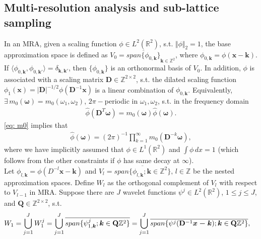 \subsection{Multi-resolution analysis and sub-lattice sampling}
In an MRA, given a scaling function $\phi\in L^2(\mathbb{R}^2)$, s.t. $\Vert\phi\Vert_2=1$,
the base approximation space is defined as $V_0 = \overline{span\{\phi_{0,\boldsymbol{k}}\}}_{\boldsymbol{k}\in\mathbb{Z}^2}$, where $\phi_{0,\boldsymbol{k}} = \phi(\boldsymbol{x}-\boldsymbol{k})$. If $\langle \phi_{0,\boldsymbol{k}},\phi_{0,\boldsymbol{k'}}\rangle = \delta_{\boldsymbol{k,k'}}$, then $\{\phi_{0,\boldsymbol{k}}\}$ is an orthonormal basis of $V_0$. In addition, $\phi$ is associated with a scaling matrix $\mathbf{D}\in\mathbb{Z}^{2\times 2}$, s.t. the dilated scaling function
 $\phi_1(\boldsymbol{x}) = |\mathbf{D}|^{-1/2}\phi(\mathbf{D}^{-1}\boldsymbol{x})$ is a linear combination of $\phi_{0,\boldsymbol{k}}$.
Equivalently, $\exists\,m_0(\boldsymbol{\omega}) = m_0(\omega_1,\omega_2)$, $2\pi-$periodic in $\omega_1,\omega_2$, s.t. in the frequency domain
\begin{align}\label{eq: m0}
\widehat{\phi}(\mathbf{D}^T\boldsymbol{\omega}) = m_0(\boldsymbol{\omega})\widehat{\phi}(\boldsymbol{\omega}).
\end{align}
\eqref{eq: m0} implies that
\begin{align}\label{eq: phi-m0}
\textstyle \hat{\phi}(\boldsymbol{\omega}) = (2\pi)^{-1}\prod_{k=1}^{\infty}m_0(\mathbf{D}^{-k} \boldsymbol{\omega}),
\end{align}
where we have implicitly assumed that $\phi\in L^1(\mathbb{R}^2)$ and $\int\phi\,dx = 1$ (which follows from the other constraints if $\phi$ has same decay at $\infty$).
\\[.2em]
Let $\phi_{l,\boldsymbol{k}} = \phi(D^{-l}\boldsymbol{x}-\boldsymbol{k})$
and $V_l = \overline{span\{\phi_{l,\boldsymbol{k}};\boldsymbol{k}\in\mathbb{Z}^2\}},\,l\in\mathbb{Z}$ be the nested approximation spaces. Define $W_l$ as the orthogonal complement of $V_l$ with respect to $V_{l-1}$ in MRA. 
Suppose there are $J$ wavelet functions $\psi^j\in L^2(\mathbb{R}^2)$, {\small $1 \leq j \leq J$}, and $\mathbf{Q}\in\mathbb{Z}^{2\times2}$, s.t.
\begin{align*}
\hspace{-1em} W_1 = \bigcup_{j=1}^J W_1^j = \bigcup_{j=1}^J \overline{span\{\psi^j_{1,\boldsymbol{k}};\boldsymbol{ k}\in \mathbf{Q}\mathbb{Z}^2\}}= \bigcup_{j=1}^J \overline{span\{\psi^j(\mathbf{D}^{-1}\boldsymbol{x-k});\boldsymbol{ k}\in \mathbf{Q}\mathbb{Z}^2\}},
\end{align*}
